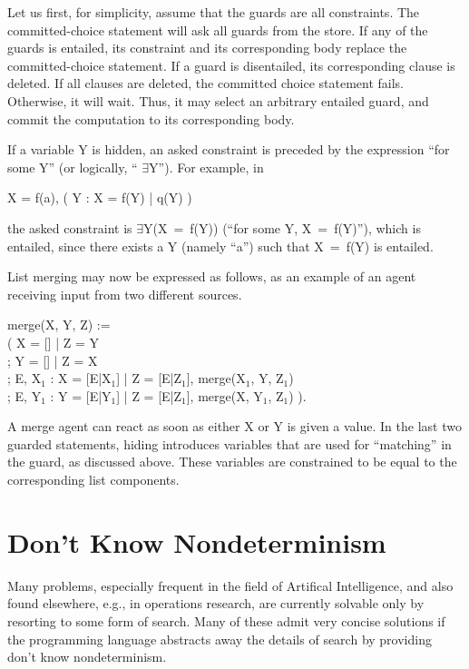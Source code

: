 Let us first, for simplicity, assume that the guards are all
constraints.  The commit\-ted-choice statement will ask all guards from
the store.  If any of the guards is entailed, its constraint and its
corresponding body replace the committed-choice statement.  If a guard
is disentailed, its corresponding clause is deleted.  If all clauses
are deleted, the committed choice statement fails.  Otherwise, it will
wait.  Thus, it may select an arbitrary entailed guard, and commit the
computation to its corresponding body.

If a variable Y is hidden, an asked constraint is preceded by the
expression ``for some {\prog Y}'' (or logically, ``{\prog
$\exists$Y}'').  For example, in
%
\begin{progex}
X = f(a), ( Y : X = f(Y) | q(Y) )
\end{progex}%
%
the asked constraint is {\prog $\exists$Y(X~=~f(Y))} (``for some
{\prog Y}, {\prog X~=~f(Y)}''), which is entailed, since there exists
a {\prog Y} (namely ``{\prog a}'') such that {\prog X~=~f(Y)} is
entailed.

List merging may now be expressed as follows, as an example of an agent 
receiving input from two different sources.
%
\begin{program}
merge(X, Y, Z) := \\
\>\>( X = [] | Z = Y \\
\>\>; Y = [] | Z = X \\
\>\>; E, X$_1$ : X = [E|X$_1$] | Z = [E|Z$_1$], merge(X$_1$, Y, Z$_1$) \\
\>\>; E, Y$_1$ : Y = [E|Y$_1$] | Z = [E|Z$_1$], merge(X, Y$_1$, Z$_1$) ).
\end{program}%
%
A merge agent can react as soon as either {\prog X} or {\prog Y} is
given a value.  In the last two guarded statements, hiding introduces
variables that are used for ``matching'' in the guard, as discussed
above.  These variables are constrained to be equal to the
corresponding list components.

\section{Don't Know Nondeterminism}

Many problems, especially frequent in the field of Artifical
Intelligence, and also found elsewhere, e.g., in operations research,
are currently solvable only by resorting to some form of search.  Many
of these admit very concise solutions if the programming language
abstracts away the details of search by providing don't know
nondeterminism.


